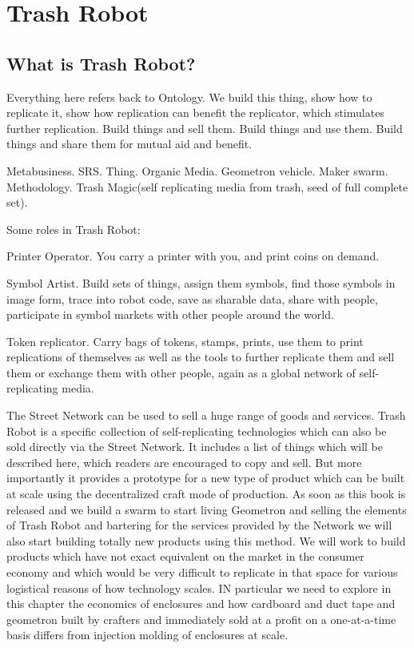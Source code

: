 \section{Trash Robot}

\subsection{What is Trash Robot?}

Everything here refers back to Ontology.  We build this thing, show how to replicate it, show how replication can benefit the replicator, which stimulates further replication.  Build things and sell them. Build things and use them. Build things and share them for mutual aid and benefit. 

Metabusiness.  SRS.  Thing.  Organic Media. Geometron vehicle.  Maker swarm. Methodology.  Trash Magic(self replicating media from trash, seed of full complete set).


Some roles in Trash Robot:

Printer Operator.  You carry a printer with you, and print coins on demand.

Symbol Artist.  Build sets of things, assign them symbols, find those symbols in image form, trace into robot code, save as sharable data, share with people, participate in symbol markets with other people around the world. 

Token replicator.  Carry bags of tokens, stamps, prints, use them to print replications of themselves as well as the tools to further replicate them and sell them or exchange them with other people, again as a global network of self-replicating media.



The Street Network can be used to sell a huge range of goods and services.  Trash Robot is a specific collection of self-replicating technologies which can also be sold directly via the Street Network.  It includes a list of things which will be described here, which readers are encouraged to copy and sell.  But more importantly it provides a prototype for a new type of product which can be built at scale using the decentralized craft mode of production.  As soon as this book is released and we build a swarm to start living Geometron and selling the elements of Trash Robot and bartering for the services provided by the Network we will also start building totally new products using this method.  We will work to build products which have not exact equivalent on the market in the consumer economy and which would be very difficult to replicate in that space for various logistical reasons of how technology scales.   IN particular we need to explore in this chapter the economics of enclosures and how cardboard and duct tape and geometron built by crafters and immediately sold at a profit on a one-at-a-time basis differs from injection molding of enclosures at scale.  

